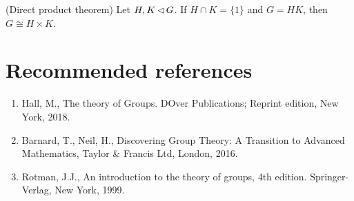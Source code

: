 \documentclass[12pt]{article}
\begin{document}
	\begin{theorem}
		(Direct product theorem) Let $H,K\operatorname{\vartriangleleft} G$. If $H\cap K = \{1\}$ and $G=HK$, then $G\cong H\times K$.
	\end{theorem}




\newpage
\appendix

\section{Recommended references}
	\begin{enumerate}
	\item Hall, M., The theory of Groups. DOver Publications; Reprint edition, New York, 2018.
	\item Barnard, T., Neil, H., Discovering Group Theory: A Transition to Advanced Mathematics, Taylor \& Francis Ltd, London, 2016.
	\item Rotman, J.J., An introduction to the theory of groups, 4th edition. Springer-Verlag, New York, 1999.
	\end{enumerate}
\end{document}
